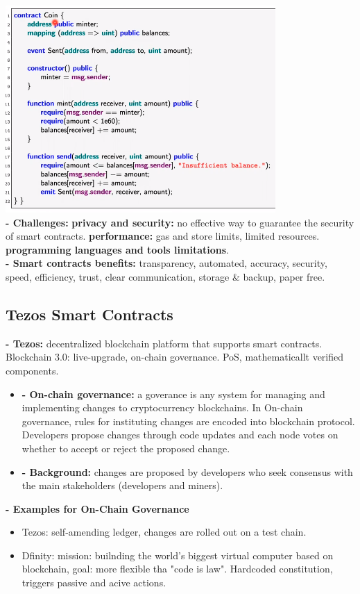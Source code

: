 \documentclass{article}
\begin{document}
\includegraphics[scale=0.7]{55.png}\\
\textbf{- Challenges: }\textbf{privacy and security: }no effective way to guarantee the security of smart contracts. \textbf{performance:} gas and store limits, limited resources. \textbf{programming languages and tools limitations}.\\
\textbf{- Smart contracts benefits: }transparency, automated, accuracy, security, speed, efficiency, trust, clear communication, storage $\&$ backup, paper free.\\
\subsection{Tezos Smart Contracts}

\textbf{- Tezos: }decentralized blockchain platform that supports smart contracts. Blockchain 3.0: live-upgrade, on-chain governance. PoS, mathematicallt verified components.\\
\begin{itemize}
    \item \textbf{- On-chain governance: } a goverance is any system for managing and implementing changes to cryptocurrency blockchains. In On-chain governance, rules for instituting changes are encoded into blockchain protocol. Developers propose changes through code updates and each node votes on whether to accept or reject the proposed change.
    \item \textbf{- Background: }changes are proposed by developers who seek consensus with the main stakeholders (developers and miners).
\end{itemize}

\textbf{- Examples for On-Chain Governance}\\
\begin{itemize}
    \item Tezos: self-amending ledger, changes are rolled out on a test chain.
    \item Dfinity: mission: builnding the world's biggest virtual computer based on blockchain, goal: more flexible tha "code is law". Hardcoded constitution, triggers passive and acive actions.
\end{itemize}
\end{document}
